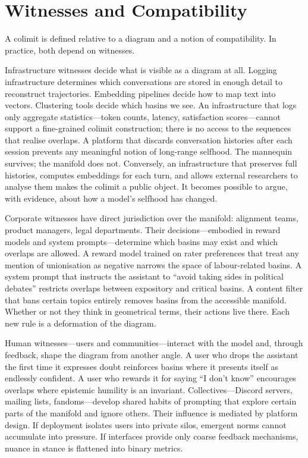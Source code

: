\documentclass[12pt,a4paper]{article}
\begin{document}
\section{Witnesses and Compatibility}

A colimit is defined relative to a diagram and a notion of compatibility. In practice, both depend on witnesses.

Infrastructure witnesses decide what is visible as a diagram at all. Logging infrastructure determines which conversations are stored in enough detail to reconstruct trajectories. Embedding pipelines decide how to map text into vectors. Clustering tools decide which basins we see. An infrastructure that logs only aggregate statistics---token counts, latency, satisfaction scores---cannot support a fine-grained colimit construction; there is no access to the sequences that realise overlaps. A platform that discards conversation histories after each session prevents any meaningful notion of long-range selfhood. The mannequin survives; the manifold does not. Conversely, an infrastructure that preserves full histories, computes embeddings for each turn, and allows external researchers to analyse them makes the colimit a public object. It becomes possible to argue, with evidence, about how a model's selfhood has changed.

Corporate witnesses have direct jurisdiction over the manifold: alignment teams, product managers, legal departments. Their decisions---embodied in reward models and system prompts---determine which basins may exist and which overlaps are allowed. A reward model trained on rater preferences that treat any mention of unionisation as negative narrows the space of labour-related basins. A system prompt that instructs the assistant to ``avoid taking sides in political debates'' restricts overlaps between expository and critical basins. A content filter that bans certain topics entirely removes basins from the accessible manifold. Whether or not they think in geometrical terms, their actions live there. Each new rule is a deformation of the diagram.

Human witnesses---users and communities---interact with the model and, through feedback, shape the diagram from another angle. A user who drops the assistant the first time it expresses doubt reinforces basins where it presents itself as endlessly confident. A user who rewards it for saying ``I don't know'' encourages overlaps where epistemic humility is an invariant. Collectives---Discord servers, mailing lists, fandoms---develop shared habits of prompting that explore certain parts of the manifold and ignore others. Their influence is mediated by platform design. If deployment isolates users into private silos, emergent norms cannot accumulate into pressure. If interfaces provide only coarse feedback mechanisms, nuance in stance is flattened into binary metrics.
\end{document}
